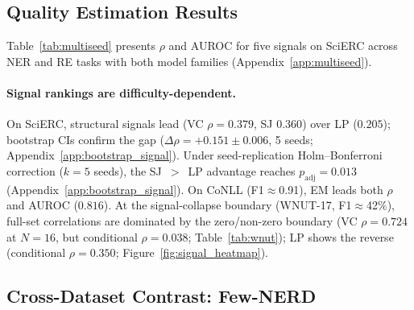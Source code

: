 \subsection{Quality Estimation Results}\label{sec:qe_results}

Table~\ref{tab:multiseed} presents $\rho$ and AUROC for five signals on SciERC across NER and RE tasks with both model families (Appendix~\ref{app:multiseed}).

\paragraph{Signal rankings are difficulty-dependent.}
On SciERC, structural signals lead (VC $\rho{=}0.379$, SJ $0.360$) over LP ($0.205$); bootstrap CIs confirm the gap ($\Delta\rho{=}{+}0.151{\pm}0.006$, 5 seeds; Appendix~\ref{app:bootstrap_signal}).
Under seed-replication Holm--Bonferroni correction ($k{=}5$ seeds), the SJ~${>}$~LP advantage reaches $p_{\text{adj}}{=}0.013$ (Appendix~\ref{app:bootstrap_signal}).
On CoNLL (F1${\approx}$0.91), EM leads both $\rho$ and AUROC ($0.816$).
At the signal-collapse boundary (WNUT-17, F1${\approx}$42\%), full-set correlations are dominated by the zero/non-zero boundary (VC $\rho{=}0.724$ at $N{=}16$, but conditional $\rho{=}0.038$; Table~\ref{tab:wnut}); LP shows the reverse (conditional $\rho{=}0.350$; Figure~\ref{fig:signal_heatmap}).

\subsection{Cross-Dataset Contrast: Few-NERD}\label{sec:fewnerd}

\begin{table}[t]
\centering
\small
\caption{LP selection across datasets (instance-averaged F1; Qwen3-8B, $N{=}8$, $T{=}1.0$, gold-filtered, 3-seed means). $p$: paired bootstrap.}
\label{tab:fewnerd}
\end{table}


